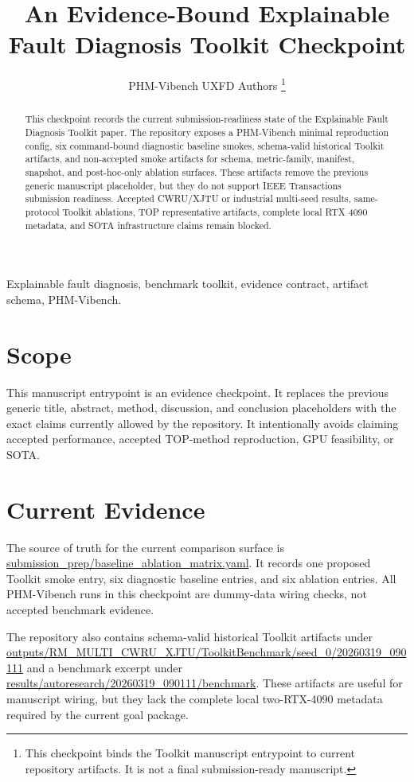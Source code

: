 \documentclass[journal]{IEEEtran}
\title{An Evidence-Bound Explainable Fault Diagnosis Toolkit Checkpoint}
\author{PHM-Vibench UXFD Authors%
\thanks{This checkpoint binds the Toolkit manuscript entrypoint to current
repository artifacts. It is not a final submission-ready manuscript.}}
\begin{document}
\maketitle

\begin{abstract}
This checkpoint records the current submission-readiness state of the
Explainable Fault Diagnosis Toolkit paper. The repository exposes a
PHM-Vibench minimal reproduction config, six command-bound diagnostic baseline
smokes, schema-valid historical Toolkit artifacts, and non-accepted smoke
artifacts for schema, metric-family, manifest, snapshot, and post-hoc-only
ablation surfaces. These artifacts remove the previous generic manuscript
placeholder, but they do not support IEEE Transactions submission readiness.
Accepted CWRU/XJTU or industrial multi-seed results, same-protocol Toolkit
ablations, TOP representative artifacts, complete local RTX 4090 metadata, and
SOTA infrastructure claims remain blocked.
\end{abstract}

\begin{IEEEkeywords}
Explainable fault diagnosis, benchmark toolkit, evidence contract,
artifact schema, PHM-Vibench.
\end{IEEEkeywords}

\section{Scope}

This manuscript entrypoint is an evidence checkpoint. It replaces the previous
generic title, abstract, method, discussion, and conclusion placeholders with
the exact claims currently allowed by the repository. It intentionally avoids
claiming accepted performance, accepted TOP-method reproduction, GPU
feasibility, or SOTA.

\section{Current Evidence}

The source of truth for the current comparison surface is
\url{submission_prep/baseline_ablation_matrix.yaml}. It records one proposed
Toolkit smoke entry, six diagnostic baseline entries, and six ablation entries.
All PHM-Vibench runs in this checkpoint are dummy-data wiring checks, not
accepted benchmark evidence.

The repository also contains schema-valid historical Toolkit artifacts under
\url{outputs/RM_MULTI_CWRU_XJTU/ToolkitBenchmark/seed_0/20260319_090111} and a
benchmark excerpt under
\url{results/autoresearch/20260319_090111/benchmark}. These artifacts are useful
for manuscript wiring, but they lack the complete local two-RTX-4090 metadata
required by the current goal package.
\end{document}

